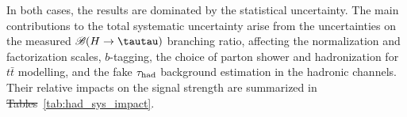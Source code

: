 \documentclass[PAPER, coverpage, atlasdraft=true, texlive=2016, UKenglish]{\ATLASLATEXPATH atlasdoc}
\providecommand{\DIFadd}[1]{{\protect\color{blue}\uwave{#1}}} %
\providecommand{\DIFdel}[1]{{\protect\color{red}\sout{#1}}}                      %
\providecommand{\DIFaddbegin}{} %
\providecommand{\DIFaddend}{} %
\providecommand{\DIFdelbegin}{} %
\providecommand{\DIFdelend}{} %
\begin{document}
In both cases, the results are dominated by the statistical uncertainty.
The main contributions to the total systematic uncertainty arise from the uncertainties on the measured $\BR(H\to \tautau)$ branching ratio,
affecting the normalization and factorization scales, $b$-tagging, the choice of parton shower and hadronization for $t\bar t$ modelling, and the fake $\tau_{\mathrm{had}}$ background estimation in the hadronic channels. Their relative impacts on the signal strength are summarized in \DIFdelbegin \DIFdel{Tables}\DIFdelend \DIFaddbegin \DIFadd{Table}\DIFaddend ~\ref{tab:had_sys_impact}.
\end{document}
